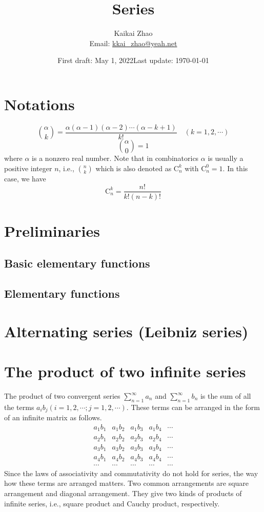 \documentclass{article}
\theoremstyle{remark}
\begin{document}
\title{Series}
\author{Kaikai Zhao\\
Email: \href{mailto:kkai\_zhao@yeah.net}{kkai\_zhao@yeah.net}
}

\date{First draft: May 1, 2022\quad Last update: \today}
\maketitle
\tableofcontents
\section{Notations}
\[
\binom{\alpha}{k}=\frac{\alpha(\alpha-1)(\alpha-2)\cdots(\alpha-k+1)}{k!}\quad (k=1,2,\cdots)
\]
\[
\binom{\alpha}{0}=1
\]
where $\alpha$ is a nonzero real number. Note that in combinatorics $\alpha$ is usually a positive integer $n$, i.e., $\binom{n}{k}$ which is also denoted as $\mathrm{C}_n^k$ with $\mathrm{C}_n^0=1$. In this case, we have
\[
\mathrm{C}_n^k=\frac{n!}{k!(n-k)!}
\]

\section{Preliminaries}
\subsection{Basic elementary functions}
\subsection{Elementary functions}




\section{Alternating series (Leibniz series)}

\section{The product of two infinite series}
The product of two convergent series $\sum_{n=1}^{\infty}a_n$ and $\sum_{n=1}^{\infty}b_n$ is the sum of all the terms $a_ib_j(i=1,2,\cdots; j=1,2,\cdots)$. These terms can be arranged in the form of an infinite matrix as follows.
\begin{equation*}
\begin{matrix}
  a_1b_1 & a_1b_2 & a_1b_3 & a_1b_4 & \cdots\\
  a_2b_1 & a_2b_2 & a_2b_3 & a_2b_4 & \cdots\\
  a_3b_1 & a_3b_2 & a_3b_3 & a_3b_4 & \cdots\\
  a_4b_1 & a_4b_2 & a_4b_3 & a_4b_4 & \cdots\\
  \cdots & \cdots & \cdots & \cdots & \cdots
\end{matrix}
\end{equation*}
Since the laws of associativity and commutativity do not hold for series, the way how these terms are arranged matters. Two common arrangements are square arrangement and diagonal arrangement. They give two kinds of products of infinite series, i.e., square product and Cauchy product, respectively.
\end{document}
